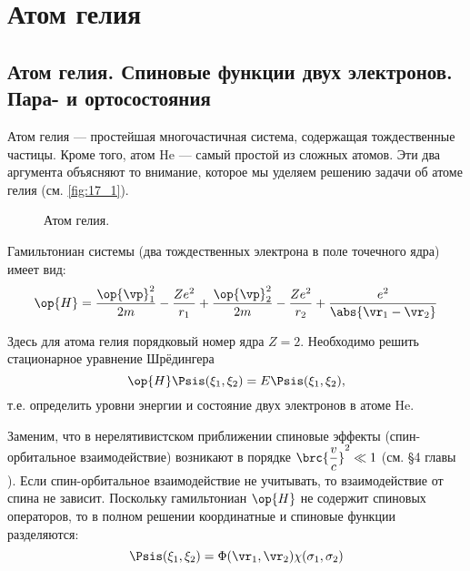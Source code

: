 \chapter{Атом гелия}

\section{Атом гелия. Спиновые функции двух электронов. Пара- и ортосостояния}

Атом гелия --- простейшая многочастичная система, содержащая тождественные частицы. Кроме того, атом He --- самый простой из сложных атомов. Эти два аргумента объясняют то внимание, которое мы уделяем решению задачи об атоме гелия (см. \autoref{fig:17_1}).
\begin{figure}[h!]
\centering
{}
\caption{Атом гелия.} \label{fig:17_1}
\end{figure}

Гамильтониан системы (два тождественных электрона в поле точечного ядра) имеет вид:
\begin{equation}
\label{eq:17_1_1}
\op{H} = \frac{\op{\vp}_1^2}{2m} - \frac{Ze^2}{r_1} + \frac{\op{\vp}_2^2}{2m} - \frac{Ze^2}{r_2} + \frac{e^2}{\abs{\vr_1 - \vr_2}}
\end{equation}

Здесь для атома гелия порядковый номер ядра $Z = 2$. Необходимо решить стационарное уравнение Шрёдингера
\begin{equation}
\label{eq:17_1_2}
\op{H} \Psis(\xi_1, \xi_2) =E\Psis(\xi_1, \xi_2),
\end{equation}
т.е. определить уровни энергии и состояние двух электронов в атоме He.

Заменим, что в нерелятивистском приближении спиновые эффекты (спин-орбитальное взаимодействие) возникают в порядке $\brc{\dfrac{v}{c}}^2 \ll 1$ (см. \S 4 главы ). Если спин-орбитальное взаимодействие не учитывать, то взаимодействие от спина не зависит. Поскольку гамильтониан $\op{H}$ не содержит спиновых операторов, то в полном решении координатные и спиновые функции разделяются:
$$
\Psis(\xi_1, \xi_2) = \Phi(\vr_1, \vr_2) \chi(\sigma_1, \sigma_2)
$$

